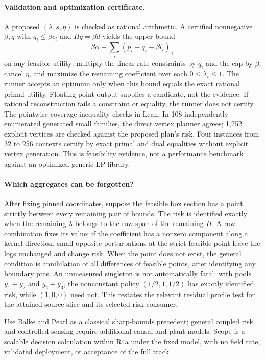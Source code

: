 \documentclass[11pt]{article}
\begin{document}
\paragraph{Validation and optimization certificate.}
A proposed $(\lambda,s,\eta)$ is checked as rational arithmetic. A certified nonnegative $\beta,q$ with $q_i\leq\beta c_i$ and $Hq=\beta d$ yields the upper bound
\[
 \beta\alpha+\sum_i (p_i-q_i-\beta l_i)_+
\]
on any feasible utility: multiply the linear rate constraints by $q_i$ and the cap by $\beta$, cancel $\eta$, and maximize the remaining coefficient over each $0\leq\lambda_i\leq1$. The runner accepts an optimum only when this bound equals the exact rational primal utility. Floating point output supplies a candidate, not the evidence. If rational reconstruction fails a constraint or equality, the runner does not certify. The pointwise coverage inequality checks in Lean. In 108 independently enumerated generated small families, the direct vertex planner agrees; 1,252 explicit vertices are checked against the proposed plan's risk. Four instances from 32 to 256 contexts certify by exact primal and dual equalities without explicit vertex generation. This is feasibility evidence, not a performance benchmark against an optimized generic LP library.

\paragraph{Which aggregates can be forgotten?}
After fixing pinned coordinates, suppose the feasible box section has a point strictly between every remaining pair of bounds. The risk is identified exactly when the remaining $\lambda$ belongs to the row span of the remaining $H$. A row combination fixes its value; if the coefficient has a nonzero component along a kernel direction, small opposite perturbations at the strict feasible point leave the logs unchanged and change risk. When the point does not exist, the general condition is annihilation of all differences of feasible points, after identifying any boundary pins. An unmeasured singleton is not automatically fatal: with pools $y_1+y_2$ and $y_2+y_3$, the nonconstant policy $(1/2,1,1/2)$ has exactly identified risk, while $(1,0,0)$ need not. This restates the relevant \href{https://github.com/eternal-november/eos-research-programmes/blob/772abb907bd2a41300f2042b427e14738442e693/projects/contextual-composition/feedback-and-concurrency/observable-covers/Residual_Profiles_and_Admission_Reflection.tex}{residual profile test} for the attained source slice and its selected risk consumer.

Use \href{https://ftp.cs.ucla.edu/pub/stat_ser/r199-jasa.pdf}{Balke and Pearl} as a classical sharp-bounds precedent; general coupled risk and controlled sensing require additional causal and plant models. Scope is a scalable decision calculation within R4a under the fixed model, with no field rate, validated deployment, or acceptance of the full track.
\end{document}
